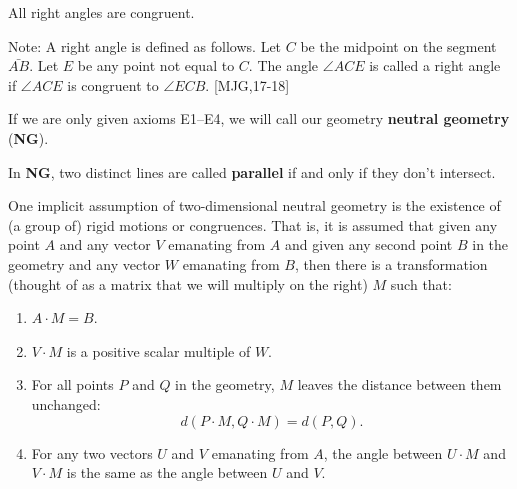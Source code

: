 \documentclass{ximera}
\begin{document}
\begin{axiom}[E4]
All right angles are congruent.

Note: A right angle is defined as follows. Let $C$ be the midpoint on
the segment $\bar{AB}$. Let $E$ be any point not equal to
$C$. The angle $\angle ACE$ is called a right angle if $\angle ACE$ is
congruent to $\angle ECB$. [MJG,17-18]
\end{axiom}

\begin{definition}
If we are only given axioms E1--E4, we will call our
geometry \textbf{neutral geometry} (\textbf{NG}).
\end{definition}

\begin{definition}
In \textbf{NG}, two distinct lines are called \textbf{parallel} if and
only if they don't intersect.
\end{definition}

One implicit assumption of two-dimensional neutral geometry is the
existence of (a group of) rigid motions or congruences. That is, it is
assumed that given any point $A$ and any vector $V$ emanating from $A$
and given any second point $B$ in the geometry and any vector $W$
emanating from $B$, then there is a transformation (thought of as a
matrix that we will multiply on the right) $M$ such that:
\begin{enumerate}
\item $A\cdot M=B$.
\item $V\cdot M$ is a positive scalar multiple of $W$.
\item For all points $P$ and $Q$ in the geometry, $M$ leaves the
  distance between them unchanged:
\[
d\left(P\cdot M,  Q\cdot M\right) =d\left( P,Q\right).
\]
\item For any two vectors $U$ and $V$ emanating from $A$, the angle
  between $U\cdot M$ and $V\cdot M$ is the same as the angle between
  $U$ and $V$.
\end{enumerate}


\end{document}
